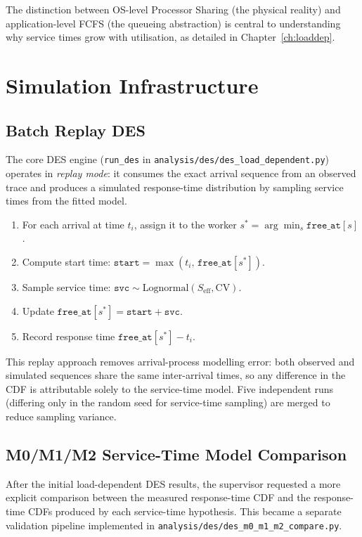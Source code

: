 The distinction between OS-level Processor Sharing (the physical reality) and application-level FCFS (the queueing abstraction) is central to understanding why service times grow with utilisation, as detailed in Chapter~\ref{ch:loaddep}.

\section{Simulation Infrastructure}
\label{sec:des-infra}

\subsection{Batch Replay DES}

The core DES engine (\texttt{run\_des} in \texttt{analysis/des/des\_load\_dependent.py}) operates in \emph{replay mode}: it consumes the exact arrival sequence from an observed trace and produces a simulated response-time distribution by sampling service times from the fitted model.

\begin{enumerate}
    \item For each arrival at time $t_i$, assign it to the worker $s^* = \arg\min_s \texttt{free\_at}[s]$.
    \item Compute start time: $\texttt{start} = \max(t_i,\, \texttt{free\_at}[s^*])$.
    \item Sample service time: $\texttt{svc} \sim \text{Lognormal}(S_\text{eff}, \text{CV})$.
    \item Update $\texttt{free\_at}[s^*] = \texttt{start} + \texttt{svc}$.
    \item Record response time $\texttt{free\_at}[s^*] - t_i$.
\end{enumerate}

This replay approach removes arrival-process modelling error: both observed and simulated sequences share the same inter-arrival times, so any difference in the CDF is attributable solely to the service-time model. Five independent runs (differing only in the random seed for service-time sampling) are merged to reduce sampling variance.

\subsection{M0/M1/M2 Service-Time Model Comparison}

After the initial load-dependent DES results, the supervisor requested a more explicit comparison between the measured response-time CDF and the response-time CDFs produced by each service-time hypothesis. This became a separate validation pipeline implemented in \texttt{analysis/des/des\_m0\_m1\_m2\_compare.py}.

